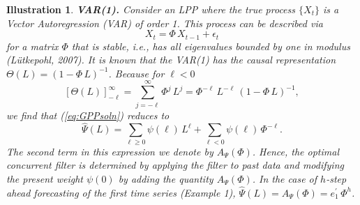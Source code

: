 \documentclass[a4paper]{book}
\newtheorem{Illustration}{Illustration}
\begin{document}
\begin{Illustration} {\bf  VAR(1).} \rm
\label{ill:var1}
 Consider an LPP where the true process $\{ X_t \}$
 is a Vector Autoregression (VAR) of order 1.  This process can be described via
\begin{equation}
\label{eq:var1-def}
  X_t = \Phi \, X_{t-1} + \epsilon_t
\end{equation}
 for a matrix $\Phi$ that is stable, i.e., has 
 all eigenvalues bounded by one in modulus (L\"utkepohl, 2007). 
It is known that the VAR(1) has the causal representation  
 $\Theta (L) = {(1 - \Phi \, L )}^{-1}$.  Because
 for $\ell < 0$ 
\[
   { [ \Theta (L) ]}_{-\ell}^{ \infty  } = \sum_{j = -\ell}^{\infty} \Phi^j \, L^j 
  = \Phi^{-\ell} \, L^{-\ell} \, {( 1 - \Phi \, L )}^{-1},
\]
 we find that (\ref{eq:GPPsoln}) reduces to
\[
  \widehat{\Psi} (L) =   \sum_{\ell \geq 0 } \psi (\ell) \, L^{\ell} +
	\sum_{\ell < 0} \psi (\ell) \, \Phi^{-\ell}.
\]
  The second term in this expression we denote by $A_{\Psi} (\Phi)$.  Hence, the optimal
 concurrent filter is determined by applying the filter to past data and modifying the
 present weight $\psi (0)$ by adding the quantity $A_{\Psi} (\Phi)$.  In the case of
 $h$-step ahead forecasting of the first time series (Example 1), $\widehat{\Psi} (L)
 = A_{\Psi} (\Phi) = e_1^{\prime} \, \Phi^h$. 
 

\end{Illustration}
\end{document}
